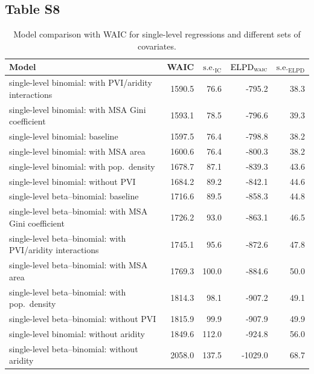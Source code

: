 \documentclass[draft]{agujournal}\usepackage{knitr}
\begin{document}
\subsection*{Table S8}
\begin{table}[H]
\centering
\begingroup\small
\begin{tabular}{p{3in}rrrr}
  \hline
Model & WAIC & $\text{s.e.}_{\text{IC}}$ & $\text{ELPD}_{\text{\scshape{waic}}}$ & $\text{s.e.}_{\text{ELPD}}$ \\ 
  \hline
single-level binomial: with PVI/aridity interactions & 1590.5 & 76.6 & -795.2 & 38.3 \\ 
  single-level binomial: with MSA Gini coefficient & 1593.1 & 78.5 & -796.6 & 39.3 \\ 
  single-level binomial: baseline & 1597.5 & 76.4 & -798.8 & 38.2 \\ 
  single-level binomial: with MSA area & 1600.6 & 76.4 & -800.3 & 38.2 \\ 
  single-level binomial: with pop.\ density & 1678.7 & 87.1 & -839.3 & 43.6 \\ 
  single-level binomial: without PVI & 1684.2 & 89.2 & -842.1 & 44.6 \\ 
  single-level beta--binomial: baseline & 1716.6 & 89.5 & -858.3 & 44.8 \\ 
  single-level beta--binomial: with MSA Gini coefficient & 1726.2 & 93.0 & -863.1 & 46.5 \\ 
  single-level beta--binomial: with PVI/aridity interactions & 1745.1 & 95.6 & -872.6 & 47.8 \\ 
  single-level beta--binomial: with MSA area & 1769.3 & 100.0 & -884.6 & 50.0 \\ 
  single-level beta--binomial: with pop.\ density & 1814.3 & 98.1 & -907.2 & 49.1 \\ 
  single-level beta--binomial: without PVI & 1815.9 & 99.9 & -907.9 & 49.9 \\ 
  single-level binomial: without aridity & 1849.6 & 112.0 & -924.8 & 56.0 \\ 
  single-level beta--binomial: without aridity & 2058.0 & 137.5 & -1029.0 & 68.7 \\ 
   \hline
\end{tabular}
\endgroup
\caption[Model comparison: WAIC (alternate covariates) for single-level regressions.]{Model comparison with WAIC for single-level regressions and different sets of covariates.} 
\label{tab:waic.vars}
\end{table}
\end{document}
